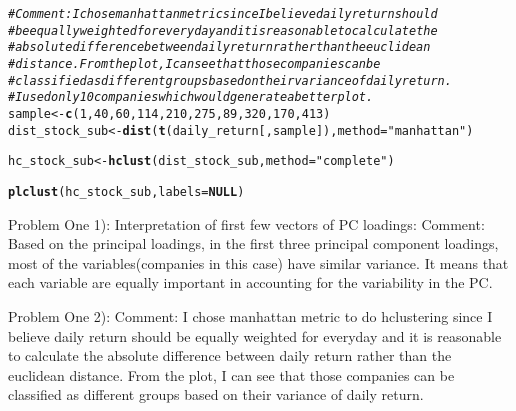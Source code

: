 \documentclass{article}\usepackage[]{graphicx}\usepackage[]{color}
\makeatletter
\newcommand{\hlnum}[1]{\textcolor[rgb]{0.686,0.059,0.569}{#1}}%
\newcommand{\hlstr}[1]{\textcolor[rgb]{0.192,0.494,0.8}{#1}}%
\newcommand{\hlcom}[1]{\textcolor[rgb]{0.678,0.584,0.686}{\textit{#1}}}%
\newcommand{\hlstd}[1]{\textcolor[rgb]{0.345,0.345,0.345}{#1}}%
\newcommand{\hlkwa}[1]{\textcolor[rgb]{0.161,0.373,0.58}{\textbf{#1}}}%
\newcommand{\hlkwb}[1]{\textcolor[rgb]{0.69,0.353,0.396}{#1}}%
\newcommand{\hlkwc}[1]{\textcolor[rgb]{0.333,0.667,0.333}{#1}}%
\newcommand{\hlkwd}[1]{\textcolor[rgb]{0.737,0.353,0.396}{\textbf{#1}}}%
\newenvironment{kframe}{%
 \def\at@end@of@kframe{}%
 \ifinner\ifhmode%
  \def\at@end@of@kframe{\end{minipage}}%
  \begin{minipage}{\columnwidth}%
 \fi\fi%
 \def\FrameCommand##1{\hskip\@totalleftmargin \hskip-\fboxsep
 \colorbox{shadecolor}{##1}\hskip-\fboxsep
     \hskip-\linewidth \hskip-\@totalleftmargin \hskip\columnwidth}%
 \MakeFramed {\advance\hsize-\width
   \@totalleftmargin\z@ \linewidth\hsize
   \@setminipage}}%
 {\par\unskip\endMakeFramed%
 \at@end@of@kframe}
\newenvironment{knitrout}{}{} %
\makeatother
\begin{document}
\begin{knitrout}
\begin{kframe}
{\ttfamily\noindent\bfseries\color{errorcolor}{\#\# Error: 找不到对象'hc\_stock'}}\begin{alltt}
\hlcom{# Comment: I chose manhattan metric since I believe daily return should}
\hlcom{# be equally weighted for everyday and it is reasonable to calculate the}
\hlcom{# absolute difference between daily return rather than the euclidean}
\hlcom{# distance. From the plot, I can see that those companies can be}
\hlcom{# classified as different groups based on their variance of daily return.}
\hlcom{# I used only 10 companies which would generate a better plot.}
\hlstd{sample} \hlkwb{<-} \hlkwd{c}\hlstd{(}\hlnum{1}\hlstd{,} \hlnum{40}\hlstd{,} \hlnum{60}\hlstd{,} \hlnum{114}\hlstd{,} \hlnum{210}\hlstd{,} \hlnum{275}\hlstd{,} \hlnum{89}\hlstd{,} \hlnum{320}\hlstd{,} \hlnum{170}\hlstd{,} \hlnum{413}\hlstd{)}
\hlstd{dist_stock_sub} \hlkwb{<-} \hlkwd{dist}\hlstd{(}\hlkwd{t}\hlstd{(daily_return[, sample]),} \hlkwc{method} \hlstd{=} \hlstr{"manhattan"}\hlstd{)}
\end{alltt}


{\ttfamily\noindent\bfseries\color{errorcolor}{\#\# Error: 找不到对象'daily\_return'}}\begin{alltt}
\hlstd{hc_stock_sub} \hlkwb{<-} \hlkwd{hclust}\hlstd{(dist_stock_sub,} \hlkwc{method} \hlstd{=} \hlstr{"complete"}\hlstd{)}
\end{alltt}


{\ttfamily\noindent\bfseries\color{errorcolor}{\#\# Error: 找不到对象'dist\_stock\_sub'}}\begin{alltt}
\hlkwd{plclust}\hlstd{(hc_stock_sub,} \hlkwc{labels} \hlstd{=} \hlkwa{NULL}\hlstd{)}
\end{alltt}


{\ttfamily\noindent\bfseries\color{errorcolor}{\#\# Error: 找不到对象'hc\_stock\_sub'}}\begin{alltt}

\end{alltt}
\end{kframe}
\end{knitrout}

Problem One 1):
Interpretation of first few vectors of PC loadings:
Comment: Based on the principal loadings, in the first three principal component loadings, most of the variables(companies in this case) have similar variance. It means that each variable are equally important in accounting for the variability in the PC.

Problem One 2):
Comment: I chose manhattan metric to do hclustering since I believe daily return should be equally weighted for everyday and it is reasonable to calculate the absolute difference between daily return rather than the euclidean distance. From the plot, I can see that those companies can be classified as different groups based on their variance of daily return.
\end{document}
